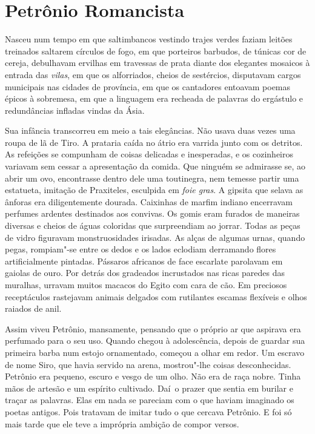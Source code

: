 \chapter{Petrônio Romancista}

Nasceu num tempo em que saltimbancos vestindo trajes verdes faziam leitões
treinados saltarem círculos de fogo, em que porteiros barbudos, de túnicas
cor de cereja, debulhavam ervilhas em travessas de prata diante dos
elegantes mosaicos à entrada das \textit{vilas}, em que os alforriados,
cheios de sestércios, disputavam cargos municipais nas cidades de
província, em que os cantadores entoavam poemas épicos à sobremesa, em que
a linguagem era recheada de palavras do ergástulo e redundâncias infladas
vindas da Ásia.

Sua infância transcorreu em meio a tais elegâncias. Não usava duas vezes
uma roupa de lã de Tiro. A prataria caída no átrio era varrida junto com
os detritos. As refeições se compunham de coisas delicadas e inesperadas,
e os cozinheiros variavam sem cessar a apresentação da comida. Que ninguém se admirasse se, 
ao abrir um ovo, encontrasse dentro dele uma toutinegra, nem
temesse partir uma estatueta, imitação de Praxiteles, esculpida em
\textit{foie gras}. A gipsita que selava as ânforas era diligentemente
dourada. Caixinhas de marfim indiano encerravam perfumes ardentes
destinados aos convivas. Os gomis eram furados de maneiras diversas e
cheios de águas coloridas que surpreendiam ao jorrar. Todas as peças de
vidro figuravam monstruosidades irisadas. As alças de algumas urnas,
quando pegas, rompiam"-se entre os dedos e os lados eclodiam derramando
flores artificialmente pintadas. Pássaros africanos de face escarlate
parolavam em gaiolas de ouro. Por detrás dos gradeados incrustados nas
ricas paredes das muralhas, urravam muitos macacos do Egito com cara de
cão. Em preciosos receptáculos rastejavam animais delgados com rutilantes
escamas flexíveis e olhos raiados de anil.

Assim viveu Petrônio, mansamente, pensando que o próprio ar que aspirava
era perfumado para o seu uso. Quando chegou à adolescência, depois de
guardar sua primeira barba num estojo ornamentado, começou a olhar em
redor. Um escravo de nome Siro, que havia servido na arena, mostrou"-lhe
coisas desconhecidas. Petrônio era pequeno, escuro e vesgo de um olho. Não
era de raça nobre. Tinha mãos de artesão e um espírito cultivado. Daí~o
prazer que sentia em burilar e traçar as palavras. Elas em nada se
pareciam com o que haviam imaginado os poetas antigos. Pois tratavam de
imitar tudo o que cercava Petrônio. E foi só mais tarde que ele teve a
imprópria ambição de compor versos.


